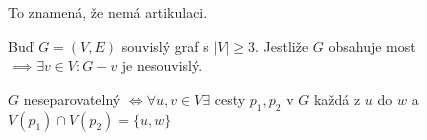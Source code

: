 \documentclass[../main.tex]{subfiles}
\begin{document}
To znamená, že nemá artikulaci. 


\begin{lemma}
    Buď $G=(V,E)$ souvislý graf s $|V|\geq 3$. Jestliže $G$ obsahuje most $\implies \exists v \in V: G-v$ je nesouvislý. 
\end{lemma}

\begin{theorem}
    $G$ neseparovatelný $\Leftrightarrow \forall u,v \in V \exists$ cesty $p_1,p_2$ v $G$ každá z $u$ do $w$ a $V(p_1)\cap V(p_2) = \{u,w\}$
\end{theorem}
\end{document}
